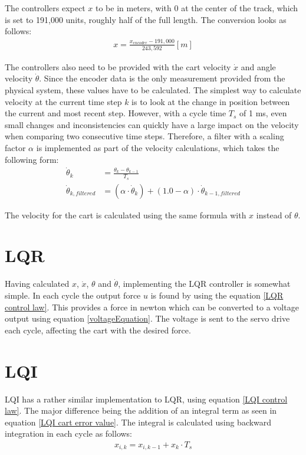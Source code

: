 The controllers expect $x$ to be in meters, with 0 at the center of the track, which is set to 191,000 units, roughly half of the full length. The conversion looks as follows:
\begin{align}
	x = \frac{x_{encoder} - 191,000}{243,592} [m]
\end{align}

The controllers also need to be provided with the cart velocity $\dot{x}$ and angle velocity $\dot{\theta}$. Since the encoder data is the only measurement provided from the physical system, these values have to be calculated. The simplest way to calculate velocity at the current time step $k$ is to look at the change in position between the current and most recent step. However, with a cycle time $T_s$ of 1 ms, even small changes and inconsistencies can quickly have a large impact on the velocity when comparing two consecutive time steps. Therefore, a filter with a scaling factor $\alpha$ is implemented as part of the velocity calculations, which takes the following form:
\begin{align}
	\dot{\theta}_k &= \frac{\theta_{k} - \theta_{k-1}}{T_s} \\
	\label{PLC theta dot}
	\dot{\theta}_{k,filtered} &= (\alpha \cdot \dot{\theta}_k) + (1.0 - \alpha) \cdot \dot{\theta}_{k-1,filtered}
\end{align}

The velocity for the cart is calculated using the same formula with $x$ instead of $\theta$.

\section{LQR}
Having calculated $x$, $\dot{x}$, $\theta$ and $\dot{\theta}$, implementing the LQR controller is somewhat simple. In each cycle the output force $u$ is found by using the equation \ref{LQR control law}. This provides a force in newton which can be converted to a voltage output using equation \ref{voltageEquation}. The voltage is sent to the servo drive each cycle, affecting the cart with the desired force.

\section{LQI}
LQI has a rather similar implementation to LQR, using equation \ref{LQI control law}. The major difference being the addition of an integral term as seen in equation \ref{LQI cart error value}. The integral is calculated using backward integration in each cycle as follows:
\begin{align}\label{PLC Integral}
	x_{i,k} = x_{i,k-1} + x_k \cdot T_s
\end{align}

